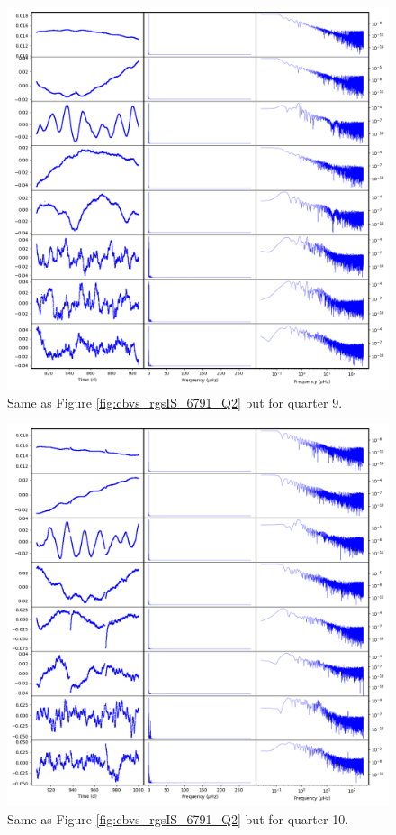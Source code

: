 \begin{figure}
    \centering
    \includegraphics[width=\linewidth]{Chapter_Appended/AppB/cbv_6791_rgs_q09.png}
    \caption{Same as Figure \ref{fig:cbvs_rgsIS_6791_Q2} but for quarter 9.}
    \label{fig:cbvs_rgsIS_6791_Q09}
\end{figure}


\begin{figure}
    \centering
    \includegraphics[width=\linewidth]{Chapter_Appended/AppB/cbv_6791_rgs_q10.png}
    \caption{Same as Figure \ref{fig:cbvs_rgsIS_6791_Q2} but for quarter 10.}
    \label{fig:cbvs_rgsIS_6791_Q10}
\end{figure}


